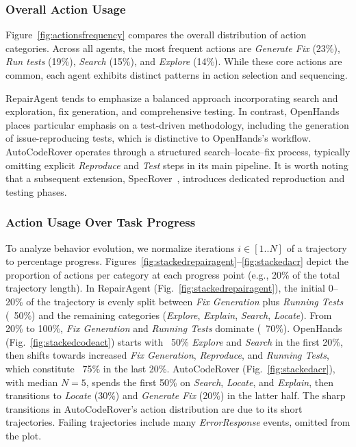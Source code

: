 \documentclass[conference,10pt]{IEEEtran}
\theoremstyle{definition}        %
\newcommand{\ra}{Repair\-Agent}
\newcommand{\oh}{Open\-Hands}
\newcommand{\acr}{Auto\-Code\-Rover}
\begin{document}
\subsubsection{Overall Action Usage}

Figure~\ref{fig:actionsfrequency} compares the overall distribution of action categories.
Across all agents, the most frequent actions are \textit{Generate Fix} (23\%), \textit{Run tests} (19\%), \textit{Search} (15\%), and \textit{Explore} (14\%).
While these core actions are common, each agent exhibits distinct patterns in action selection and sequencing.

\ra{} tends to emphasize a balanced approach incorporating search and exploration, fix generation, and comprehensive testing. In contrast, \oh{} places particular emphasis on a test-driven methodology, including the generation of issue-reproducing tests, which is distinctive to \oh{}'s workflow. \acr{} operates through a structured search–locate–fix process, typically omitting explicit \textit{Reproduce} and \textit{Test} steps in its main pipeline. It is worth noting that a subsequent extension, SpecRover~\cite{ruan2024specrover}, introduces dedicated reproduction and testing phases.

\subsubsection{Action Usage Over Task Progress}






To analyze behavior evolution, we normalize iterations \(i \in [1..N]\) of a trajectory to percentage progress. Figures~\ref{fig:stackedrepairagent}–\ref{fig:stackedacr} depict the proportion of actions per category at each progress point (e.g., 20\% of the total trajectory length). In \ra{} (Fig.~\ref{fig:stackedrepairagent}), the initial 0–20\% of the trajectory is evenly split between \textit{Fix Generation} plus \textit{Running Tests} (~50\%) and the remaining categories (\textit{Explore}, \textit{Explain}, \textit{Search}, \textit{Locate}). From 20\% to 100\%, \textit{Fix Generation} and \textit{Running Tests} dominate (~70\%). \oh{} (Fig.~\ref{fig:stackedcodeact}) starts with ~50\% \textit{Explore} and \textit{Search} in the first 20\%, then shifts towards increased \textit{Fix Generation}, \textit{Reproduce}, and \textit{Running Tests}, which constitute ~75\% in the last 20\%. \acr{} (Fig.~\ref{fig:stackedacr}), with median \(N=5\), spends the first 50\% on \textit{Search}, \textit{Locate}, and \textit{Explain}, then transitions to \textit{Locate} (30\%) and \textit{Generate Fix} (20\%) in the latter half.
The sharp transitions in \acr{}'s action distribution are due to its short trajectories.
Failing trajectories include many \textit{ErrorResponse} events, omitted from the plot.
\end{document}
